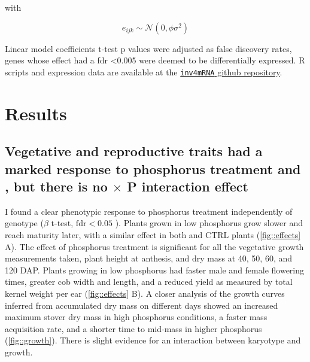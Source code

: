 with 

$$e_{ijk} \sim \mathcal{N} (0,\phi\sigma^2)$$

Linear model coefficients t-test p values were adjusted as false discovery rates, genes whose effect had a fdr <0.005 were deemed to be differentially expressed.
R scripts and expression data are  available at the  \href{https://github.com/sawers-rellan-labs/inv4mRNA}{\texttt{inv4mRNA} github repository}.








\section{Results}

\subsection{Vegetative and reproductive traits had a marked response to phosphorus treatment and \invfour, but there is no  \invfour $\times$ P interaction effect}

I found a clear phenotypic response to phosphorus treatment independently of \invfour genotype ($\beta$ t-test, $\textrm{fdr} < 0.05$ ). 
Plants grown in low phosphorus grow slower and reach maturity later, with a similar effect in both \invfour and CTRL plants (\autoref{fig::effects} A). 
The effect of phosphorus treatment is significant for all the vegetative growth measurements taken, plant height at anthesis, and dry mass at 40, 50, 60, and 120 DAP.  
Plants growing in low phosphorus had faster male and female flowering times, greater cob width and length, and a reduced yield as measured by total kernel weight per ear (\autoref{fig::effects} B).
A closer analysis of the growth curves inferred from accumulated dry mass on different days showed an increased maximum stover dry mass in high phosphorus conditions, a faster mass acquisition rate, and a shorter time to mid-mass in higher phosphorus (\autoref{fig::growth}). 
There is slight evidence for an interaction between \invfour karyotype and growth. 


